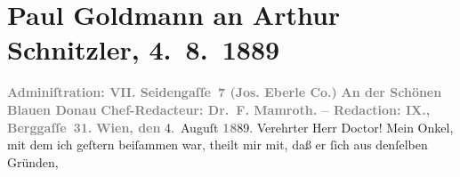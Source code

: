 

         
         \renewcommand{\erwaehntePersonen}{Personen: Fedor Mamroth, Julius Schnitzler}
         \renewcommand{\erwaehnteInstitutionen}{Institutionen: An der schönen blauen Donau, Josef Eberle Stein-, Buch und Musikaliendruckerei}
         \renewcommand{\erwaehnteOrte}{Orte: Bad Ischl, Berggasse, Reichenau, Seidengasse, Traunkirchen, Wien}
         \renewcommand{\erwaehnteWerke}{Werke: Der Sohn. Aus den Papieren eines Arztes}
               \section[Paul Goldmann an Arthur Schnitzler, 4. 8. 1889]{ Paul Goldmann an Arthur Schnitzler, 4. 8. 1889}\nopagebreak{}\rehead{ }\begin{ledgroupsized}[t]{13cm}\normalsize\beginnumbering \toendnotes[C]{\smallbreak\pagebreak[2]} 
\toendnotes[C]{\smallbreak}\pstart
           \noindent{}\centering{}{\pb}\textcolor{gray}{\textbf{\textbf{Adminiſtration: VII.
                           Seidengaſſe 7} (Jos. Eberle {\kaufmannsund} Co.)}}\pend
           \pstart
           \noindent{}\centering{}\textcolor{gray}{\textbf{An der Schönen Blauen Donau}}\pend
           \pstart
           \noindent{}\centering{}\textcolor{gray}{\textbf{Chef-Redacteur: Dr. F.
                        Mamroth. – Redaction: IX.,
                        Berggaſſe 31.}}\pend
           \pstart
           \raggedleft{}\textcolor{gray}{\textbf{Wien, den}}{ }4. Auguſt \textcolor{gray}{\textbf{18}}89.\pend
           \pstart{}Verehrter Herr Doctor!\pend\pstart
           Mein Onkel, mit dem ich geſtern beiſammen war, theilt mir mit, daß er ſich aus denſelben Gründen,

\end{ledgroupsized}
